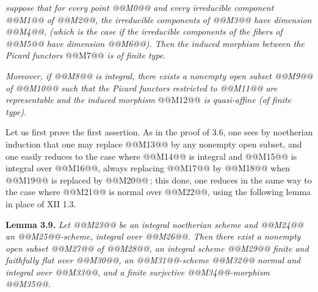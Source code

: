\emph{suppose that for every point @@M0@@ and every irreducible component @@M1@@ of @@M2@@, the irreducible components of @@M3@@ have dimension @@M4@@, (which is the case if the irreducible components of the fibers of @@M5@@ have dimension @@M6@@). Then the induced morphism between the Picard functors}
@@M7@@
\emph{is of finite type.}

\emph{Moreover, if @@M8@@ is integral, there exists a nonempty open subset @@M9@@ of @@M10@@ such that the Picard functors restricted to @@M11@@ are representable and the induced morphism}
@@M12@@
\emph{is quasi-affine (of finite type).}

Let us first prove the first assertion. As in the proof of 3.6, one sees by noetherian induction that one may replace @@M13@@ by any nonempty open subset, and one easily reduces to the case where @@M14@@ is integral and @@M15@@ is integral over @@M16@@, always replacing @@M17@@ by @@M18@@ when @@M19@@ is replaced by @@M20@@\,; this done, one reduces in the same way to the case where @@M21@@ is normal over @@M22@@, using the following lemma in place of XII 1.3.

\textbf{Lemma 3.9.} \emph{Let @@M23@@ be an integral noetherian scheme and @@M24@@ an @@M25@@-scheme, integral over @@M26@@. Then there exist a nonempty open subset @@M27@@ of @@M28@@, an integral scheme @@M29@@ finite and faithfully flat over @@M30@@, an @@M31@@-scheme @@M32@@ normal and integral over @@M33@@, and a finite surjective @@M34@@-morphism @@M35@@.}

